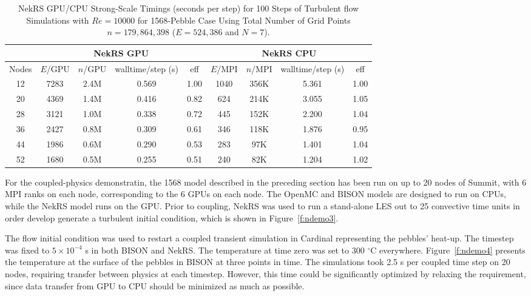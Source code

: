 \begin{table}
  \centering
  \begin{tabular}{c|cccc||cccc}
    \hline 
  \multicolumn{1}{c|}{ } &
  \multicolumn{4}{|c||}{NekRS GPU}  &
  \multicolumn{4}{|c}{NekRS CPU} \\
  \hline
    Nodes  &  $E$/GPU & $n$/GPU & walltime/step (s) & eff & $E$/MPI& $n$/MPI & walltime/step (s) & eff\\
  \hline
    12 & 7283 & 2.4M & 0.569 & 1.00 & 1040 & 356K & 5.361  & 1.00\\
    20 & 4369 & 1.4M & 0.416 & 0.82 & 624 & 214K  & 3.055  & 1.05\\
    28 & 3121 & 1.0M & 0.338 & 0.72 & 445 & 152K & 2.200  & 1.04\\
    36 & 2427 & 0.8M & 0.309 & 0.61 & 346 & 118K & 1.876  & 0.95\\
    44 & 1986 & 0.6M & 0.290 & 0.53 & 283 & 97K & 1.401  & 1.04\\
    52 & 1680 & 0.5M & 0.255 & 0.51 & 240 & 82K & 1.204  & 1.02\\
    \hline \hline
  \end{tabular}
  \caption{NekRS GPU/CPU Strong-Scale Timings (seconds per step) for 100 Steps of Turbulent flow Simulations
   with $Re=10000$ for 1568-Pebble Case Using Total Number of Grid Points $n=179,864,398$ ($E=524,386$ and $N=7$).} 
  \label{tab:nekrs}
\end{table}

For the coupled-physics demonstratin, the 1568 model described in the preceding
section has been run on up to 20 nodes of Summit, with 6 MPI ranks on each
node, corresponding to the 6 GPUs on each node. The OpenMC and BISON models are
designed to run on CPUs, while the NekRS model runs on the GPU. Prior to
coupling, NekRS was used to run a stand-alone LES out to 25 convective time
units in order develop generate a turbulent initial condition, which is shown
in Figure~\ref{f:ndemo3}.

The flow initial condition was used to restart a coupled transient simulation in
Cardinal representing the pebbles' heat-up. The timestep was fixed to $5\times
10^{-4}$ s in both BISON and NekRS. The temperature at time zero was set to 300
$^{\circ}$C everywhere. Figure~\ref{f:ndemo4} presents the temperature at the
surface of the pebbles in BISON at three points in time. The simulations took
2.5 s per coupled time step on 20 nodes, requiring transfer between physics at
each timestep. However, this time could be significantly optimized by relaxing
the requirement, since data transfer from GPU to CPU should be minimized as
much as possible.

